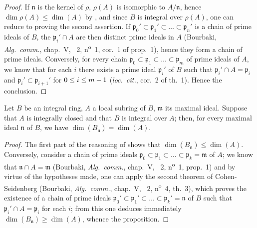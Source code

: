 \begin{proof}
If $\mathfrak{n}$ is the kernel of $\rho$, $\rho(A)$ is isomorphic to $A/\mathfrak{n}$, hence $\dim\rho(A)\leq\dim(A)$ by , and since $B$ is integral over $\rho(A)$, one can reduce to proving the second assertion.
If $\mathfrak{p}_0'\subset\mathfrak{p}_1'\subset\ldots\subset\mathfrak{p}_n'$ is a chain of prime ideals of $B$, the $\mathfrak{p}_i'\cap A$ are then distinct prime ideals in $A$ (Bourbaki, \emph{Alg.~comm.}, chap.~V, \textsection~2, n\textsuperscript{o}~1, cor.~1 of prop.~1), hence they form a chain of prime ideals.
Conversely, for every chain $\mathfrak{p}_0\subset\mathfrak{p}_1\subset\ldots\subset\mathfrak{p}_m$ of prime ideals of $A$, we know that for each $i$ there exists a prime ideal $\mathfrak{p}_i'$ of $B$ such that $\mathfrak{p}_i'\cap A=\mathfrak{p}_i$ and $\mathfrak{p}_i'\subset\mathfrak{p}_{i+1}'$ for $0\leq i\leq m- 1$ (\emph{loc.~cit.}, cor.~2 of th.~1).
Hence the conclusion.
\end{proof}

\begin{proposition}[16.1.6]
\label{0.16.1.6}
Let $B$ be an integral ring, $A$ a local subring of $B$, $\mathfrak{m}$ its maximal ideal.
Suppose that $A$ is integrally closed and that $B$ is integral over $A$; then, for every maximal ideal $\mathfrak{n}$ of $B$, we have $\dim(B_\mathfrak{n})=\dim(A)$.
\end{proposition}

\begin{proof}
The first part of the reasoning of  shows that $\dim(B_\mathfrak{n})\leq\dim(A)$.
Conversely, consider a chain of prime ideals $\mathfrak{p}_0\subset\mathfrak{p}_1\subset\ldots\subset\mathfrak{p}_k=\mathfrak{m}$ of $A$; we know that $\mathfrak{n}\cap A=\mathfrak{m}$ (Bourbaki, \emph{Alg.~comm.}, chap.~V, \textsection~2, n\textsuperscript{o}~1, prop.~1) and by virtue of the hypotheses made, one can apply the second theorem of Cohen-Seidenberg (Bourbaki, \emph{Alg.~comm.}, chap.~V, \textsection~2, n\textsuperscript{o}~4, th.~3), which proves the existence of a chain of prime ideals $\mathfrak{p}_0'\subset\mathfrak{p}_1'\subset\ldots\subset\mathfrak{p}_k'=\mathfrak{n}$ of $B$ such that $\mathfrak{p}_i'\cap A=\mathfrak{p}_i$ for each $i$; from this one deduces immediately $\dim(B_\mathfrak{n})\geq\dim(A)$, whence the proposition.
\end{proof}

